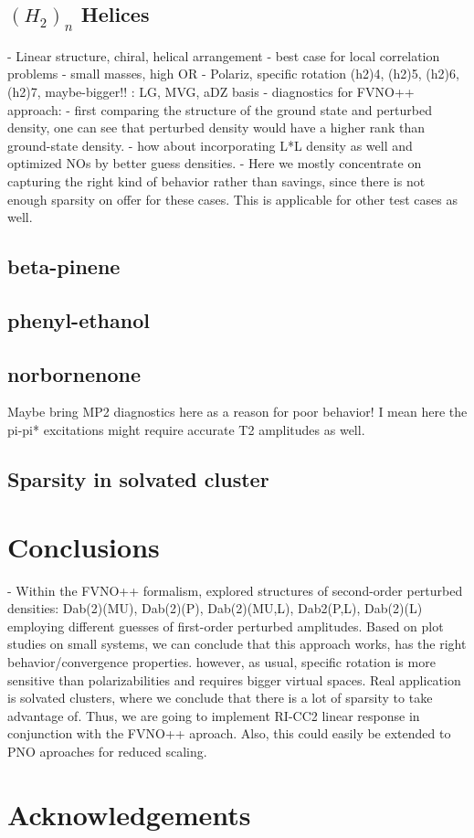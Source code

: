 \subsection{$(H_2)_n$ Helices}
- Linear structure, chiral, helical arrangement
- best case for local correlation problems
- small masses, high OR
- Polariz, specific rotation (h2)4, (h2)5, (h2)6, (h2)7, maybe-bigger!! : LG, MVG, aDZ basis
- diagnostics for FVNO++ approach:
	- first comparing the structure of the ground state and perturbed density, one can see 
	  that perturbed density would have a higher rank than ground-state density.
	- how about incorporating L*L density as well and optimized NOs by better guess densities.
	- Here we mostly concentrate on capturing the right kind of behavior rather 
  	than savings, since there is not enough sparsity on offer for these cases.
  	This is applicable for other test cases as well.
\subsection{beta-pinene}
\subsection{phenyl-ethanol}
\subsection{norbornenone}
Maybe bring MP2 diagnostics here as a reason for poor behavior! I mean here the pi-pi*
excitations might require accurate T2 amplitudes as well.
\subsection{Sparsity in solvated cluster}
\section{Conclusions}

- Within the FVNO++ formalism, explored 
structures of second-order perturbed densities:
Dab(2)(MU), Dab(2)(P), Dab(2)(MU,L), Dab2(P,L), Dab(2)(L) 
employing different guesses of first-order perturbed amplitudes.  
Based on plot studies on small systems, we can conclude that 
this approach works, has the right behavior/convergence properties.
however, as usual, specific rotation is more sensitive than
polarizabilities and requires bigger virtual spaces.
Real application is solvated clusters, where we conclude that
there is a lot of sparsity to take advantage of.
Thus, we are going to implement RI-CC2 linear response
in conjunction with the FVNO++ aproach.
Also, this could easily be extended to PNO aproaches for reduced scaling.

\section{Acknowledgements}
